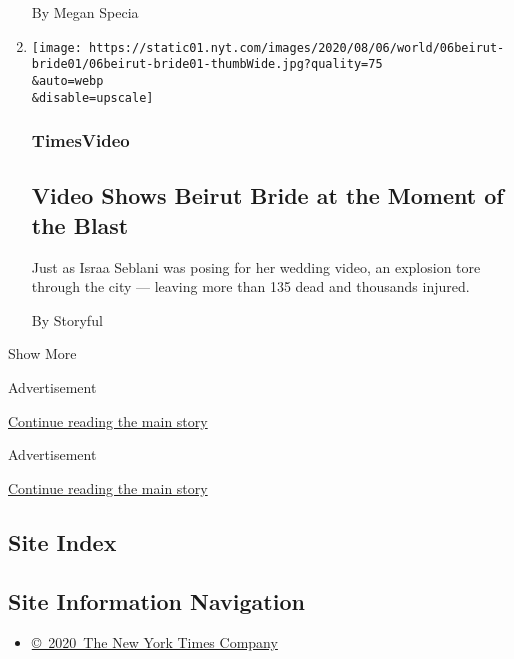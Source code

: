 \begin{enumerate}
  By Megan Specia
\item
  \href{/video/world/middleeast/100000007275939/beirut-bride-lebanon.html}{}

  \texttt{[image: https://static01.nyt.com/images/2020/08/06/world/06beirut-bride01/06beirut-bride01-thumbWide.jpg?quality=75\\\&auto=webp\\\&disable=upscale]}

  \hypertarget{timesvideo}{%
  \subsubsection{TimesVideo}\label{timesvideo}}

  \hypertarget{video-shows-beirut-bride-at-the-moment-of-the-blast}{%
  \subsection{Video Shows Beirut Bride at the Moment of the
  Blast}\label{video-shows-beirut-bride-at-the-moment-of-the-blast}}

  Just as Israa Seblani was posing for her wedding video, an explosion
  tore through the city --- leaving more than 135 dead and thousands
  injured.

  By Storyful
\end{enumerate}

Show More

Advertisement

\protect\hyperlink{after-mid1}{Continue reading the main story}

Advertisement

\protect\hyperlink{after-mktg}{Continue reading the main story}

\hypertarget{site-index}{%
\subsection{Site Index}\label{site-index}}

\hypertarget{site-information-navigation}{%
\subsection{Site Information
Navigation}\label{site-information-navigation}}

\begin{itemize}
\tightlist
\item
  \href{https://help.nytimes.com/hc/en-us/articles/115014792127-Copyright-notice}{©~2020~The
  New York Times Company}
\end{itemize}

